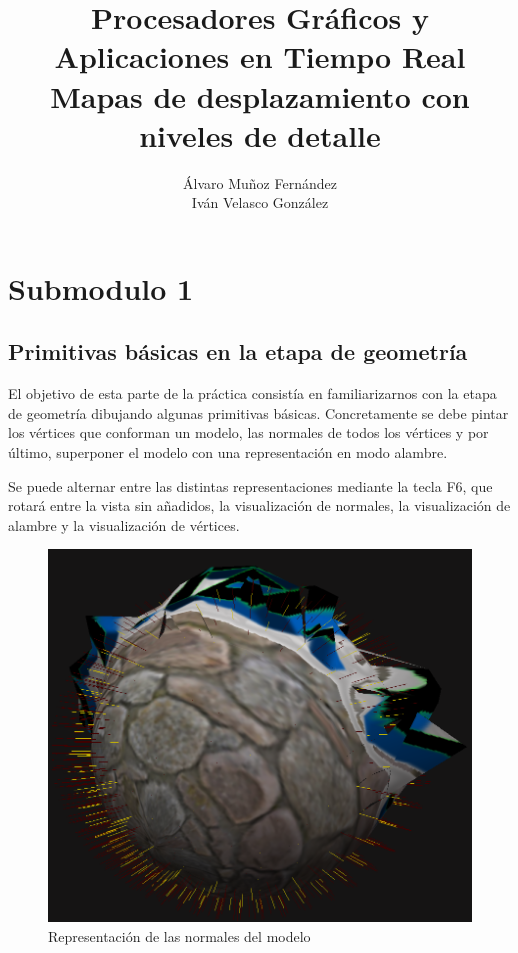 \documentclass[10pt,oneside,a4paper]{article}
\begin{document}
\begin{titlepage}

\title{\Huge Procesadores Gráficos y Aplicaciones en Tiempo Real  \\[0.7in] \LARGE Mapas de desplazamiento con niveles de detalle\\[3.6in]}
\date{}
\author{Álvaro Muñoz Fernández\\
Iván Velasco González}
\maketitle
\thispagestyle{empty}
\end{titlepage}

\section{Submodulo 1}
\subsection{Primitivas básicas en la etapa de geometría}
El objetivo de esta parte de la práctica consistía en familiarizarnos con la etapa de geometría
dibujando algunas primitivas básicas. Concretamente se debe pintar los vértices que conforman un modelo,
las normales de todos los vértices y por último, superponer el modelo con una representación en modo alambre.

Se puede alternar entre las distintas representaciones mediante la tecla F6, que rotará entre la vista sin añadidos, la visualización de normales, la visualización de alambre y la visualización de vértices.\\

\begin{figure}[h!tbp]
\centering
\includegraphics[width=.6\linewidth]{pgatrimgs/Normals.png}
\caption{Representación de las normales del modelo}
\end{figure}
\end{document}
